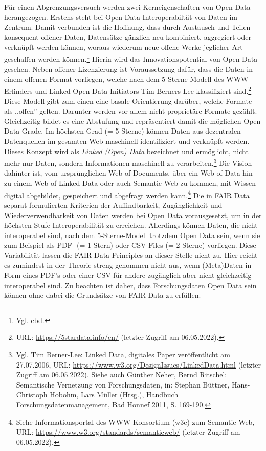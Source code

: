 Für einen Abgrenzungsversuch werden zwei Kerneigenschaften von Open Data herangezogen. Erstens steht bei Open Data Interoperabiltät von Daten im Zentrum. Damit verbunden ist die Hoffnung, dass durch Austausch und Teilen konsequent offener Daten, Datensätze gänzlich neu kombiniert, aggregiert oder verknüpft werden können, woraus wiederum neue offene Werke jeglicher Art geschaffen werden können.\footnote{Vgl. ebd.} Hierin wird das Innovationspotential von Open Data gesehen. Neben offener Lizenzierung ist Voraussetzung dafür, dass die Daten in einem offenen Format vorliegen, welche nach dem 5-Sterne-Modell des WWW-Erfinders und Linked Open Data-Initiators Tim Berners-Lee klassifiziert sind.\footnote{URL: \url{https://5stardata.info/en/} (letzter Zugriff am 06.05.2022).} Diese Modell gibt zum einen eine basale Orientierung darüber, welche Formate als ,,offen'' gelten. Darunter werden vor allem nicht-proprietäre Formate gezählt. Gleichzeitig bildet es eine Abstufung und repräsentiert damit die möglichen Open Data-Grade. Im höchsten Grad (= 5 Sterne) können Daten aus dezentralen Datenquellen im gesamten Web maschinell identifiziert und verknüpft werden. Dieses Konzept wird als \textit{Linked (Open) Data} bezeichnet und ermöglicht, nicht mehr nur Daten, sondern Informationen maschinell zu verarbeiten.\footnote{Vgl. Tim Berner-Lee: Linked Data, digitales Paper veröffentlicht am 27.07.2006, URL: \url{https://www.w3.org/DesignIssues/LinkedData.html} (letzter Zugriff am 06.05.2022). Siehe auch Günther Neher, Bernd Ritschel: Semantische Vernetzung von Forschungsdaten, in: Stephan Büttner, Hans-Christoph Hobohm, Lars Müller (Hrsg.), Handbuch Forschungsdatenmanagement, Bad Honnef 2011, S. 169-190.} Die Vision dahinter ist, vom ursprünglichen Web of Documents, über ein Web of Data hin zu einem Web of Linked Data oder auch Semantic Web zu kommen, mit Wissen digital abgebildet, gespeichert und abgefragt werden kann.\footnote{Siehe Informationsportal des WWW-Konsortium (w3c) zum Semantic Web, URL: \url{https://www.w3.org/standards/semanticweb/} (letzter Zugriff am 06.05.2022).} Die in FAIR Data separat formulierten Kriterien der Auffindbarkeit, Zugänglichkeit und Wiederverwendbarkeit von Daten werden bei Open Data vorausgesetzt, um in der höchsten Stufe Interoperabilität zu erreichen. Allerdings können Daten, die nicht interoperabel sind, nach dem 5-Sterne-Modell trotzdem Open Data sein, wenn sie zum Beispiel als PDF- (= 1 Stern) oder CSV-Files (= 2 Sterne) vorliegen. Diese Variabilität lassen die FAIR Data Principles an dieser Stelle nicht zu. Hier reicht es zumindest in der Theorie streng genommen nicht aus, wenn (Meta)Daten in Form eines PDF's oder einer CSV für andere zugänglich aber nicht gleichzeitig interoperabel sind. Zu beachten ist daher, dass Forschungsdaten Open Data sein können ohne dabei die Grundsätze von FAIR Data zu erfüllen.

